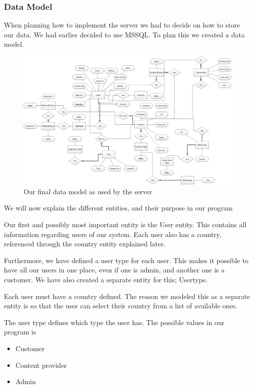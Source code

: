 \subsubsection{Data Model}
When planning how to implement the server we had to decide on how to store our data. We had earlier decided to use MSSQL. To plan this we created a data model.
\begin{figure}[t]
  \includegraphics[width=\textwidth]{illustrations/Datamodel.png}
  \caption{Our final data model as used by the server}
  \label{fig:datamodel}
\end{figure}
We will now explain the different entities, and their purpose in our program

Our first and possibly most important entity is the User entity. This contains all information regarding users of our system. Each user also has a country, referenced through the country entity explained later.

Furthermore, we have defined a user type for each user. This makes it possible to have all our users in one place, even if one is admin, and another one is a customer. We have also created a separate entity for this; Usertype.

Each user must have a country defined. The reason we modeled this as a separate entity is so that the user can select their country from a list of available ones.

The user type defines which type the user has. The possible values in our program is
\begin{itemize}
	\item Customer
	\item Content provider
	\item Admin
\end{itemize}

